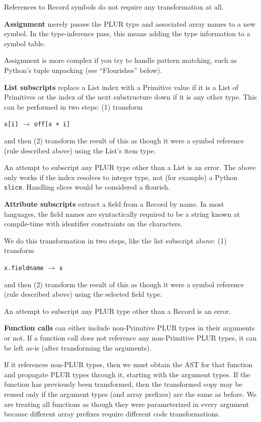 \documentclass[10pt, conference, compsocconf]{IEEEtran}
\begin{document}
References to Record symbols do not require any transformation at all.

{\bf Assignment} merely passes the PLUR type and associated array names to a new symbol. In the type-inference pass, this means adding the type information to a symbol table.

Assignment is more complex if you try to handle pattern matching, such as Python's tuple unpacking (see ``Flourishes'' below).

{\bf List subscripts} replace a List index with a Primitive value if it is a List of Primitives or the index of the next substructure down if it is any other type. This can be performed in two steps: (1) transform
\begin{center}
{\tt x[i]} $\to$ {\tt off[x + i]}
\end{center}
and then (2) transform the result of this as though it were a symbol reference (rule described above) using the List's item type.

An attempt to subscript any PLUR type other than a List is an error. The above only works if the index resolves to integer type, not (for example) a Python {\tt slice}. Handling slices would be considered a flourish.

{\bf Attribute subscripts} extract a field from a Record by name. In most languages, the field names are syntactically required to be a string known at compile-time with identifier constraints on the characters.

We do this transformation in two steps, like the list subscript above: (1) transform
\begin{center}
{\tt x.fieldname} $\to$ {\tt x}
\end{center}
and then (2) transform the result of this as though it were a symbol reference (rule described above) using the selected field type.

An attempt to subscript any PLUR type other than a Record is an error.

{\bf Function calls} can either include non-Primitive PLUR types in their arguments or not. If a function call does not reference any non-Primitive PLUR types, it can be left as-is (after transforming the arguments).

If it references non-PLUR types, then we must obtain the AST for that function and propagate PLUR types through it, starting with the argument types. If the function has previously been transformed, then the transformed copy may be reused only if the argument types (and array prefixes) are the same as before. We are treating all functions as though they were parameterized in every argument because different array prefixes require different code transformations.
\end{document}
